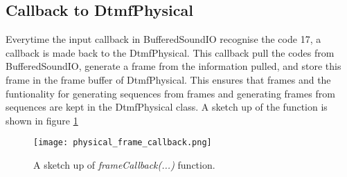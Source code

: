 	\subsection{Callback to DtmfPhysical}
	Everytime the input callback in BufferedSoundIO recognise the code 17, a callback is made back to the DtmfPhysical. This callback pull the
	codes from BufferedSoundIO, generate a frame from the information pulled, and store this frame in the frame buffer of DtmfPhysical. This ensures
	that frames and the funtionality for generating sequences from frames and generating frames from sequences are kept in the DtmfPhysical class.
	A sketch up of the function is shown in figure \ref{fig:physical_frame_callback}
	
	\begin{figure}[htb]
		\begin{center}
		\texttt{[image: physical\_frame\_callback.png]}%
		\caption{A sketch up of \textit{frameCallback(...)} function.}
		\label{fig:physical_frame_callback}
		\end{center}
	\end{figure}